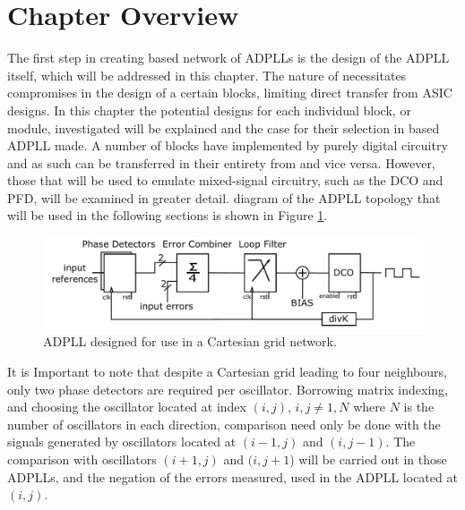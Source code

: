 \section{Chapter Overview}
The first step in creating  based network of \acp{ADPLL} is the design of the \ac{ADPLL} itself, which will be addressed in this chapter. The nature of  necessitates compromises in the design of a certain blocks, limiting direct transfer from \ac{ASIC} designs. In this chapter the potential designs for each individual block, or module, investigated will be explained and the case for their selection in  based \ac{ADPLL} made. A number of blocks have implemented by purely digital circuitry and as such can be transferred in their entirety from  and vice versa. However, those that will be used to emulate mixed-signal circuitry, such as the \ac{DCO} and \ac{PFD}, will be examined in greater detail.  diagram of the \ac{ADPLL} topology that will be used in the following sections is shown in Figure \ref{fig:network_adpll}.
\begin{figure}[h]
	\centering
	\includegraphics[width=\textwidth]{../network_adpll}
	\caption{\ac{ADPLL} designed for use in a Cartesian grid network.}
	\label{fig:network_adpll}
\end{figure}

It is Important to note that despite a Cartesian grid leading to four neighbours, only two phase detectors are required per oscillator. Borrowing matrix indexing, and choosing the oscillator located at index $(i,j)$, $i,j \neq 1,N$ where $N$ is the number of oscillators in each direction, comparison need only be done with the signals generated by oscillators located at $(i-1,j)$ and $(i,j-1)$. The comparison with oscillators $(i+1,j)$ and $(i,j+1$) will be carried out in those \acp{ADPLL}, and the negation of the errors measured, used in the \ac{ADPLL} located at $(i,j)$.

